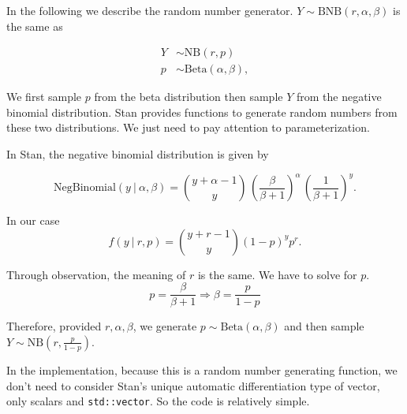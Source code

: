 \documentclass[11pt]{article}
\begin{document}
In the following we describe the random number generator. $Y \sim \text{BNB}(r,\alpha,\beta)$ is the same as

\begin{equation*}
  \begin{aligned}
  Y &\sim \text{NB}(r,p) \\
  p &\sim {\textrm {Beta}}(\alpha ,\beta ),
  \end{aligned}
\end{equation*}

We first sample $p$ from the beta distribution then sample $Y$ from the negative binomial distribution. Stan provides functions to generate random numbers from these two distributions. We just need to pay attention to parameterization.

In Stan, the negative binomial distribution is given by

\begin{equation}
\text{NegBinomial}(y~|~\alpha,\beta)  = \binom{y +
\alpha - 1}{y} \, \left( \frac{\beta}{\beta+1}
\right)^{\!\alpha} \, \left( \frac{1}{\beta + 1} \right)^{\!y} \!.
\end{equation}

In our case 
\begin{equation}
f(y~|~r,p)  = \binom {y+r-1}{y} (1-p)^{y} p^{r}.
\end{equation}

Through observation, the meaning of $r$ is the same. We have to solve for $p$.
\begin{equation}
	p = \frac{\beta}{\beta+1} \Rightarrow \beta = \frac{p}{1-p}
\end{equation}

Therefore, provided $r, \alpha, \beta$, we generate $ p \sim {\textrm {Beta}}(\alpha ,\beta )$ and then sample $Y \sim \text{NB}(r, \frac{p}{1-p})$.


In the implementation, because this is a random number generating function, we don't need to consider Stan's unique automatic differentiation type of vector, only scalars and \verb|std::vector|. So the code is relatively simple.
\end{document}
